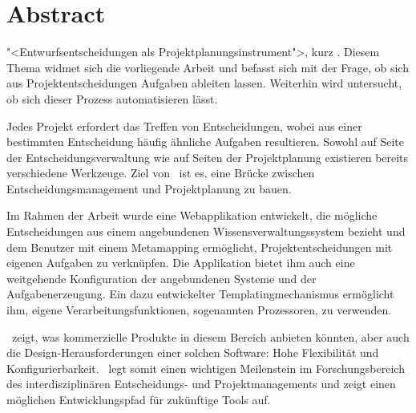 \chapter{Abstract}
	

	"<Entwurfsentscheidungen als Projektplanungsinstrument">, kurz \eeppi . 
	Diesem Thema widmet sich die vorliegende Arbeit und befasst sich mit der Frage, 
	ob sich aus Projektentscheidungen Aufgaben ableiten lassen. 
	Weiterhin wird untersucht, ob sich dieser Prozess automatisieren lässt. 

	Jedes Projekt erfordert das Treffen von Entscheidungen, 
	wobei aus einer bestimmten Entscheidung häufig ähnliche Aufgaben resultieren. 
	Sowohl auf Seite der Entscheidungsverwaltung wie auf Seiten der Projektplanung existieren bereits verschiedene Werkzeuge. 
	Ziel von \eeppi\ ist es, eine Brücke zwischen Entscheidungsmanagement und Projektplanung zu bauen.

	Im Rahmen der Arbeit wurde eine Webapplikation entwickelt, 
	die mögliche Entscheidungen aus einem angebundenen Wissensverwaltungssystem bezieht 
	und dem Benutzer mit einem Metamapping ermöglicht,
	Projektentscheidungen mit eigenen Aufgaben zu verknüpfen. 
	Die Applikation bietet ihm auch eine weitgehende Konfiguration der angebundenen Systeme und der Aufgabenerzeugung. 
	Ein dazu entwickelter Templatingmechanismus ermöglicht ihm, eigene Verarbeitungsfunktionen, sogenannten Prozessoren, zu verwenden. 

	\eeppi\ zeigt, was kommerzielle Produkte in diesem Bereich anbieten könnten, 
	aber auch die Design-Herausforderungen einer solchen Software: 
	Hohe Flexibilität und Konfigurierbarkeit. 
	\eeppi\ legt somit einen wichtigen Meilenstein im Forschungsbereich des interdisziplinären Entscheidungs- und Projektmanagements 
	und zeigt einen möglichen Entwicklungspfad für zukünftige Tools auf.

